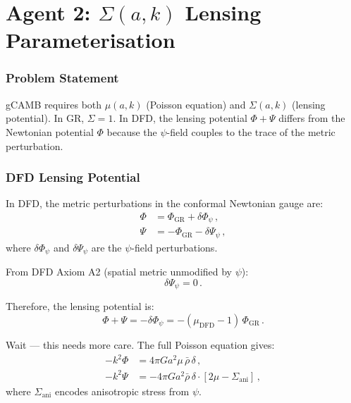 \documentclass[11pt,a4paper]{article}
\begin{document}
\part{Agent 2: $\Sigma(a,k)$ Lensing Parameterisation}
\label{part:sigma-module}

\section{Problem Statement}

gCAMB requires both $\mu(a,k)$ (Poisson equation) and $\Sigma(a,k)$ (lensing potential). In GR, $\Sigma = 1$. In DFD, the lensing potential $\Phi + \Psi$ differs from the Newtonian potential $\Phi$ because the $\psi$-field couples to the trace of the metric perturbation.

\section{DFD Lensing Potential}

In DFD, the metric perturbations in the conformal Newtonian gauge are:
\begin{align}
\Phi &= \Phi_{\mathrm{GR}} + \delta\Phi_\psi\,, \\
\Psi &= -\Phi_{\mathrm{GR}} - \delta\Psi_\psi\,,
\end{align}
where $\delta\Phi_\psi$ and $\delta\Psi_\psi$ are the $\psi$-field perturbations.

From DFD Axiom A2 (spatial metric unmodified by $\psi$):
\begin{equation}
\delta\Psi_\psi = 0\,.
\end{equation}

Therefore, the lensing potential is:
\begin{equation}
\Phi + \Psi = -\delta\Phi_\psi = -(\mu_{\mathrm{DFD}} - 1)\,\Phi_{\mathrm{GR}}\,.
\end{equation}

Wait --- this needs more care. The full Poisson equation gives:
\begin{align}
-k^2\Phi &= 4\pi G a^2 \mu\,\bar{\rho}\,\delta\,, \\
-k^2\Psi &= -4\pi G a^2 \bar{\rho}\,\delta \cdot [2\mu - \Sigma_{\mathrm{ani}}]\,,
\end{align}
where $\Sigma_{\mathrm{ani}}$ encodes anisotropic stress from $\psi$.
\end{document}
